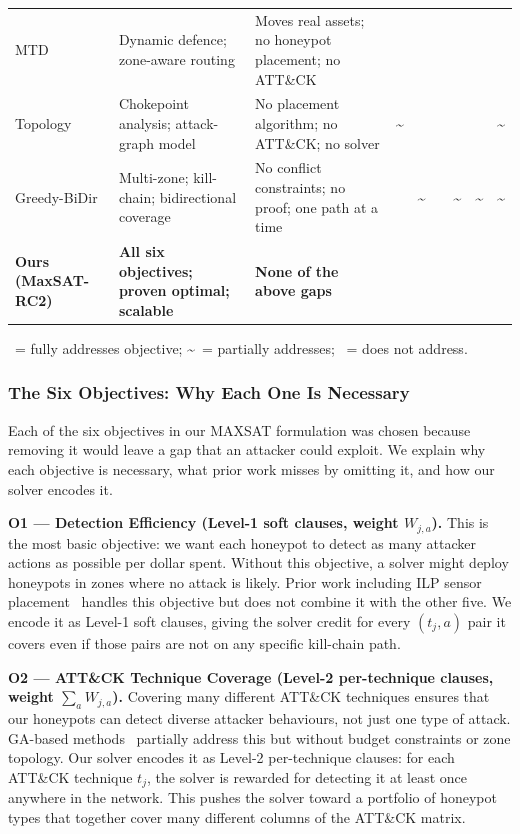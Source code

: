 \documentclass[journal]{IEEEtran}
\newcommand{\cmark}{\textcolor{novelgreen}{\ding{51}}}
\newcommand{\xmark}{\textcolor{novelred}{\ding{55}}}
\newcommand{\pmark}{\textcolor{novelamber}{\textbf{\textasciitilde}}}
\begin{document}
\begin{table}[!t]
\begin{tabular}{@{}p{2.8cm}p{3.2cm}p{3.2cm}cccccc@{}}
MTD~\cite{zhu2013}
  & Dynamic defence; zone-aware routing
  & Moves real assets; no honeypot placement; no ATT\&CK
  & \xmark & \xmark & \xmark & \xmark & \xmark & \xmark \\

Topology~\cite{jajodia2005}
  & Chokepoint analysis; attack-graph model
  & No placement algorithm; no ATT\&CK; no solver
  & \pmark & \xmark & \xmark & \xmark & \xmark & \pmark \\

Greedy-BiDir
  & Multi-zone; kill-chain; bidirectional coverage
  & No conflict constraints; no proof; one path at a time
  & \cmark & \pmark & \xmark & \pmark & \pmark & \pmark \\
\midrule
\rowcolor{rowours}
\textbf{Ours (MaxSAT-RC2)}
  & \textbf{All six objectives; proven optimal; scalable}
  & \textbf{None of the above gaps}
  & \cmark & \cmark & \cmark & \cmark & \cmark & \cmark \\
\bottomrule
\end{tabular}
\vspace{2pt}
{\scriptsize
\cmark\ = fully addresses objective;\quad
\pmark\ = partially addresses;\quad
\xmark\ = does not address.}
\end{table}

\subsubsection{The Six Objectives: Why Each One Is Necessary}
\label{subsubsec:sixobj}

Each of the six objectives in our MAXSAT formulation was
chosen because removing it would leave a gap that an
attacker could exploit.
We explain why each objective is necessary, what prior work
misses by omitting it, and how our solver encodes it.

\medskip
\noindent\textbf{O1 --- Detection Efficiency (Level-1 soft
clauses, weight $W_{j,a}$).}
This is the most basic objective: we want each honeypot to
detect as many attacker actions as possible per dollar
spent.
Without this objective, a solver might deploy honeypots in
zones where no attack is likely.
Prior work including ILP sensor placement~\cite{saha2015}
handles this objective but does not combine it with the
other five.
We encode it as Level-1 soft clauses, giving the solver
credit for every $(t_j, a)$ pair it covers even if those
pairs are not on any specific kill-chain path.

\medskip
\noindent\textbf{O2 --- ATT\&CK Technique Coverage
(Level-2 per-technique clauses, weight
$\sum_a W_{j,a}$).}
Covering many different ATT\&CK techniques ensures that our
honeypots can detect diverse attacker behaviours, not just
one type of attack.
GA-based methods~\cite{hemberg2020} partially address this
but without budget constraints or zone topology.
Our solver encodes it as Level-2 per-technique clauses:
for each ATT\&CK technique $t_j$, the solver is rewarded
for detecting it at least once anywhere in the network.
This pushes the solver toward a portfolio of honeypot types
that together cover many different columns of the ATT\&CK
matrix.
\end{document}

